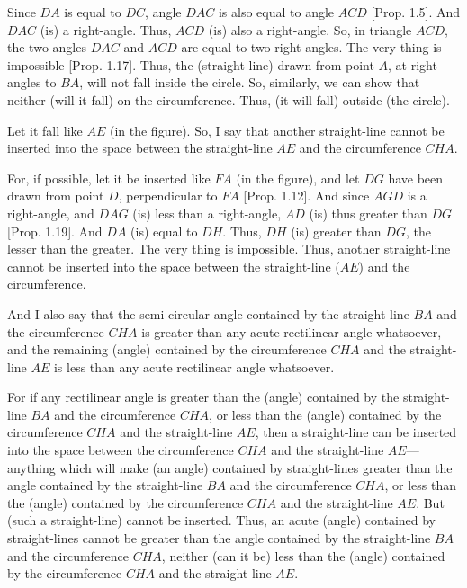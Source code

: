 \begin{Parallel}{}{}
{Since $DA$ is equal to $DC$, angle $DAC$ is also equal to angle $ACD$ [Prop. 1.5].
And $DAC$ (is) a right-angle. Thus, $ACD$ (is) also a right-angle. So, in triangle
$ACD$, the two angles $DAC$ and $ACD$ are equal to two right-angles. 
The very thing is
impossible [Prop. 1.17]. Thus, the (straight-line) drawn from point $A$,
at right-angles to $BA$, will not fall inside the circle. So, similarly, we can show 
that neither (will it fall) on the circumference. Thus, (it will fall) outside
(the circle).

\epsfysize=2in
\centerline{}

Let it fall like $AE$ (in the figure). So, I say that another straight-line cannot
be inserted into the space between the straight-line $AE$ and the
circumference $CHA$.

For, if possible, let it be inserted like $FA$ (in the figure), and let $DG$ have
been drawn from point $D$, perpendicular to $FA$ [Prop. 1.12]. And since $AGD$ is a right-angle, and
 $DAG$ (is) less than a right-angle, $AD$ (is) thus greater than $DG$  [Prop. 1.19]. And $DA$ (is) equal to $DH$. Thus, $DH$ (is)
greater than $DG$, the lesser than the greater. The very thing is impossible.
Thus, another straight-line cannot be inserted into the space between the
straight-line ($AE$) and the circumference.

And I also say that the  semi-circular angle  contained by the straight-line
$BA$ and the circumference $CHA$ is greater than any acute rectilinear angle whatsoever,
and the remaining (angle) contained by the circumference $CHA$ and the straight-line
$AE$ is less than any acute rectilinear angle whatsoever.

For if any rectilinear angle is greater than the (angle) contained by the
straight-line $BA$ and the circumference $CHA$, or  less than the (angle)
contained by the circumference $CHA$ and the straight-line $AE$, then
a straight-line can be inserted into the space between the circumference 
$CHA$ and the straight-line $AE$---anything which will make (an angle)
contained by straight-lines greater than the angle contained by the straight-line $BA$ and the circumference $CHA$, or less than the (angle) contained 
by the circumference $CHA$ and the straight-line $AE$. But (such a straight-line)
cannot be inserted. Thus, an acute (angle) contained by straight-lines
cannot be greater than the angle contained by the straight-line $BA$ and
the circumference $CHA$, neither (can it be) less than the (angle) contained by
the circumference $CHA$ and the straight-line $AE$.\\

}
\end{Parallel}

